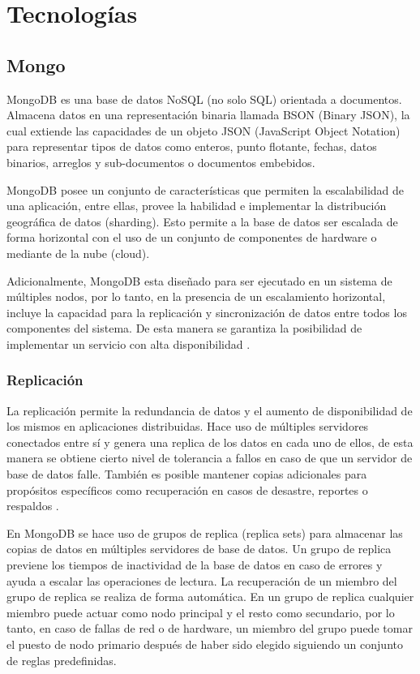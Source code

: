 \section{Tecnologías}

\subsection{Mongo}

MongoDB es una base de datos NoSQL (no solo SQL) orientada a documentos. Almacena
datos en una representación binaria llamada BSON (Binary JSON), la cual extiende
las capacidades de un objeto JSON (JavaScript Object Notation) para representar
tipos de datos como enteros, punto flotante, fechas, datos binarios, arreglos y sub-documentos o
documentos embebidos.

MongoDB posee un conjunto de  características que permiten la escalabilidad de una aplicación, entre ellas,
provee la habilidad e implementar la distribución geográfica de datos (sharding). Esto permite a la
base de datos ser escalada de forma horizontal con el uso de un conjunto de componentes de hardware o mediante
de la nube (cloud).

Adicionalmente, MongoDB esta diseñado para ser ejecutado en un sistema de múltiples nodos, por lo tanto,
en la presencia de un escalamiento horizontal, incluye la capacidad para la replicación
y sincronización de datos entre todos los componentes del sistema. De esta manera se garantiza la posibilidad
de implementar un servicio con alta disponibilidad \cite{10}.

\subsubsection{Replicación}

La replicación permite la redundancia de datos y el aumento de disponibilidad de los mismos en aplicaciones distribuidas.
Hace uso de múltiples servidores conectados entre sí y genera una replica de los datos en cada uno de ellos, de
esta manera se obtiene cierto nivel de tolerancia a fallos en caso de que un servidor de base de datos falle. 
También es posible mantener copias adicionales para propósitos específicos como recuperación en casos de desastre,
reportes o respaldos \cite{11}.

En MongoDB se hace uso de grupos de replica (replica sets) para almacenar las copias de datos en múltiples
servidores de base de datos. Un grupo de replica previene los tiempos de inactividad de la base de datos
en caso de errores y ayuda a escalar las operaciones de lectura. La recuperación de un miembro del grupo de
replica se realiza de forma automática. En un grupo de replica cualquier miembro puede actuar como nodo principal 
y el resto como secundario, por lo tanto, en caso de fallas de red o de hardware, un miembro del grupo
puede tomar el puesto de nodo primario después de haber sido elegido siguiendo un conjunto de reglas predefinidas.

